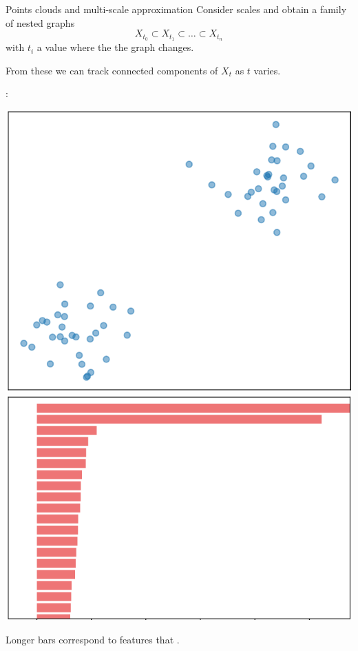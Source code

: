 \begin{frame}{Points clouds and multi-scale approximation}
	\pause
	Consider  scales and obtain a family of nested graphs
	\[
	X_{t_0} \subset X_{t_1} \subset\dots\subset X_{t_n}
	\]
	with $t_i$ a value where the the graph changes.

	\medskip\pause
	From these we can track connected components of $X_t$ as $t$ varies.

	\medskip\pause
	:

	\begin{center}
		\includegraphics[scale=.25]{aux/2Dcloud_cropped.pdf}
		\pause\qquad
		\includegraphics[scale=.313]{aux/2Dbarcode_cropped.pdf}
	\end{center}

	\medskip\pause
	Longer bars correspond to features that .
\end{frame}

